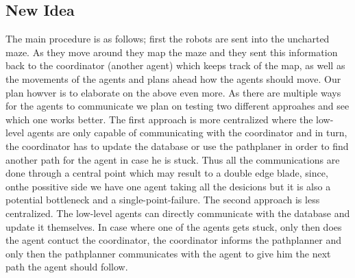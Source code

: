 \subsection{New Idea}
The main procedure is as follows; first the robots are sent into the uncharted maze. As they move around they map the maze and they sent this information back to the coordinator (another agent) which keeps track of the map, as well as the movements of the agents and plans ahead how the agents should move. Our plan howver is to elaborate on the above even more. As there are multiple ways for the agents to communicate we plan on testing two different approahes and see which one works better. The first approach is more centralized where the low-level agents are only capable of communicating with the coordinator and in turn, the coordinator has to update the database or use the pathplaner in order to find another path for the agent in case he is stuck. Thus all the communications are done through a central point which may result to a double edge blade, since, onthe possitive side we have one agent taking all the desicions but it is also a potential bottleneck and a single-point-failure. The second approach is less centralized. The low-level agents can directly communicate with the database and update it themselves. In case where one of the agents gets stuck, only then does the agent contuct the coordinator, the coordinator informs the pathplanner and only then the pathplanner communicates with the agent to give him the next path the agent should follow. 